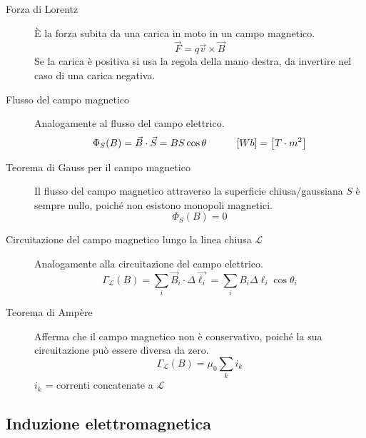 \documentclass[a4paper,11pt,italian]{article}
\begin{document}
\begin{description}
  \item[Forza di Lorentz] 
  È la forza subita da una carica in moto in un campo magnetico.
  \[ \vec{F} = q \vec{v} \times \vec{B} \]
  Se la carica è positiva si usa la regola della mano destra, da invertire nel caso di una carica negativa.
  

  
  \item[Flusso del campo magnetico] 
  Analogamente al flusso del campo elettrico.
  \[ \Phi_S(B) = \vec{B} \cdot \vec{S} = B S \cos \theta \hspace*{3em} [Wb] = \left[ T \cdot m^2 \right] \]
  
  \item[Teorema di Gauss per il campo magnetico] 
  Il flusso del campo magnetico attraverso la superficie chiusa/gaussiana $ S $ è sempre nullo, poiché non esistono monopoli magnetici.
  \[ \Phi_S(B) = 0 \]
  
  \item[Circuitazione del campo magnetico lungo la linea chiusa $ \mathscr{L} $]\label{conc:circuitazioneB}
  Analogamente alla circuitazione del campo elettrico.
  \[ \Gamma_\mathscr{L}(B) = \sum_i \vec{B}_i \cdot \Delta\vec{\ell_i} = \sum_i B_i \Delta \ell_i \cos \theta_i \]
  
  \item[Teorema di Ampère] 
  Afferma che il campo magnetico non è conservativo, poiché la sua circuitazione può essere diversa da zero.
  \[ \Gamma_\mathscr{L}(B) = \mu_0 \sum_k i_k \]
  $ i_k $ = correnti concatenate a $ \mathscr{L} $
\end{description}

\subsection{Induzione elettromagnetica}
\end{document}

